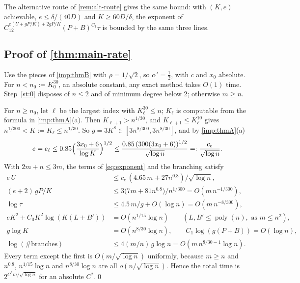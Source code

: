 \documentclass[11pt]{amsart}
\theoremstyle{plain}
\theoremstyle{definition}
\theoremstyle{remark}
\numberwithin{equation}{section}
\newcommand{\poly}{\operatorname{poly}}
\begin{document}
The alternative route of \cref{rem:alt-route} gives the same bound: with $(K,e)$ achievable,
$e\le\delta/(40D)$ and $K\ge60D/\delta$, the exponent of $C_12^{e(U+gP/K)+2gP/K}(P+B)^{C_1}\tau$
is bounded by the same three lines.

\subsection{Proof of \texorpdfstring{\cref{thm:main-rate}}{Theorem 1.2}}\label{sec:proof-rate}
Use the pieces of \cref{imp:thmB} with $\rho=1/\sqrt2$, so $\alpha'=\frac12$, with $c$ and $x_0$
absolute. For $n<n_0:=K_0^{30}$, an absolute constant, any exact method takes $O(1)$ time.
Step~\ref{st:0} disposes of $n\le2$ and of minimum degree below $2$; otherwise $m\ge n$.

For $n\ge n_0$, let $\ell$ be the largest index with $K_\ell^{30}\le n$; $K_\ell$ is computable from
the formula in \cref{imp:thmA}(a). Then $K_{\ell+1}>n^{1/30}$, and $K_{\ell+1}\le K_\ell^{10}$ gives
$n^{1/300}<K:=K_\ell\le n^{1/30}$. So $g=3K^8\in[3n^{8/300},3n^{8/30}]$, and by \cref{imp:thmA}(a)
\[
  e=e_\ell\le0.85\Bigl(\frac{3x_0+6}{\log K}\Bigr)^{1/2}\le\frac{0.85\,(300(3x_0+6))^{1/2}}{\sqrt{\log n}}=:\frac{c_e}{\sqrt{\log n}} .
\]
With $2m+n\le3m$, the terms of \eqref{eq:exponent} and the branching satisfy
\begin{align*}
  e\,U&\le c_e\,(4.65\,m+27n^{0.8})/\sqrt{\log n},\\
  (e+2)\,gP/K&\le3\bigl(7m+81n^{0.8}\bigr)/n^{1/300}=O(m\,n^{-1/300}),\\
  \log\tau&\le4.5\,m/g+O(\log n)=O(m\,n^{-8/300}),\\
  eK^2+C_0K^2\log(K(L+B'))&=O(n^{1/15}\log n)\qquad(L,B'\le\poly(n),\text{ as }m\le n^2),\\
  g\log K&=O(n^{8/30}\log n),\qquad C_1\log(g(P+B))=O(\log n),\\
  \log(\#\text{branches})&\le4(m/n)\,g\log n=O(m\,n^{8/30-1}\log n).
\end{align*}
Every term except the first is $O(m/\sqrt{\log n})$ uniformly, because $m\ge n$ and $n^{0.8}$,
$n^{1/15}\log n$ and $n^{8/30}\log n$ are all $o(n/\sqrt{\log n})$. Hence the total time is
$2^{C^*m/\sqrt{\log n}}$ for an absolute $C^*$.\qed
\end{document}
